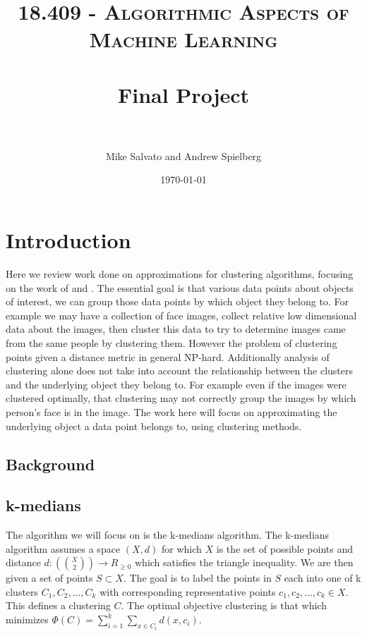 \documentclass[paper=a4, fontsize=11pt]{scrartcl} %
\title{	
\normalfont \normalsize 
\textsc{18.409 - Algorithmic Aspects of Machine Learning} \\ [25pt] %
\horrule{0.5pt} \\[0.4cm] %
\huge Final Project \\ %
\horrule{2pt} \\[0.5cm] %
}
\author{Mike Salvato and Andrew Spielberg} %
\date{\normalsize\today} %
\numberwithin{equation}{section} %
\numberwithin{figure}{section} %
\numberwithin{table}{section} %
\begin{document}
\maketitle %

\section{Introduction}

Here we review work done on approximations for clustering algorithms, focusing on the work of \cite{firstpaper} and \cite{secondpaper}. The essential goal is that various data points about objects of interest, we can group those data points by which object they belong to. For example we may have a collection of face images, collect relative low dimensional data about the images, then cluster this data to try to determine images came from the same people by clustering them. However the problem of clustering points given a distance metric in general NP-hard. Additionally analysis of clustering alone does not take into account the relationship between the clusters and the underlying object they belong to. For example even if the images were clustered optimally, that clustering may not correctly group the images by which person's face is in the image. The work here will focus on approximating the underlying object a data point belongs to, using clustering methods.

\subsection{Background}

\subsection{k-medians}
The algorithm we will focus on is the k-medians algorithm. The k-medians algorithm assumes a space $(X, d)$ for which $X$ is the set of possible points and distance $d : ({ X \choose 2}) \rightarrow R_{\geq 0}$ which satisfies the triangle inequality. We are then given a set of points $S \subset X$. The goal is to label the points in $S$ each into one of k clusters $C_1, C_2, ..., C_k$ with corresponding representative points $c_1, c_2, ..., c_k \in X$. This defines a clustering $C$. The optimal objective clustering is that which minimizes $\Phi(C) = \sum\limits_{i = 1}^k \sum_{x \in C_i} d(x, c_i)$.
\end{document}

